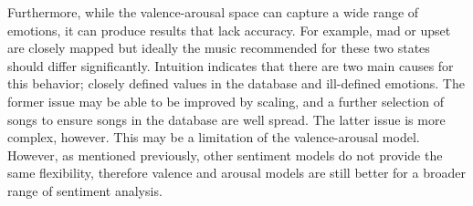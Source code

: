 \documentclass[10pt,journal,compsoc]{IEEEtran}
\begin{document}
	Furthermore, while the valence-arousal space can capture a wide range of emotions, it can produce results that lack accuracy. For example, mad or upset are closely mapped but ideally the music recommended for these two states should differ significantly. Intuition indicates that there are two main causes for this behavior; closely defined values in the database and ill-defined emotions. The former issue may be able to be improved by scaling, and a further selection of songs to ensure songs in the database are well spread. The latter issue is more complex, however. This may be a limitation of the valence-arousal model. However, as mentioned previously, other sentiment models do not provide the same flexibility, therefore valence and arousal models are still better for a broader range of sentiment analysis.
	
	



%
%

\end{document}
